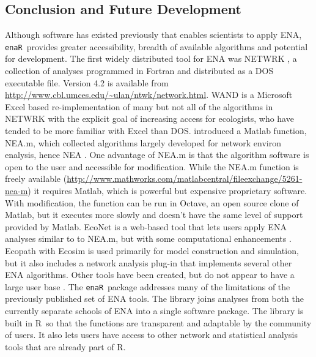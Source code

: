 \documentclass[11pt]{article}
\newcommand{\R}{R}
\newcommand{\enaR}{\texttt{enaR}}
\begin{document}
\begin{spacing}{2}
\section{Conclusion and Future Development}
Although software has existed previously that enables scientists to
apply ENA, \enaR\ provides greater accessibility, breadth of available
algorithms and potential for development. The first widely distributed
tool for ENA was NETWRK \citep{ulanowicz91}, a collection of analyses
programmed in Fortran and distributed as a DOS executable
file. Version 4.2 is available from
\url{http://www.cbl.umces.edu/~ulan/ntwk/network.html}. WAND is a
Microsoft Excel based re-implementation of many but not all of the
algorithms in NETWRK \citep{allesina04_wand} with the explicit goal of
increasing access for ecologists, who have tended to be more familiar
with Excel than DOS.  \citet{fath06} introduced a Matlab function,
NEA.m, which collected algorithms largely developed for network
environ enalysis, hence NEA \citep{patten91}.  One advantage of NEA.m
is that the algorithm software is open to the user and
accessible for modification.  While the NEA.m function is freely
available
(\url{http://www.mathworks.com/matlabcentral/fileexchange/5261-nea-m})
it requires Matlab, which is powerful but expensive proprietary
software.  With modification, the function can be run in Octave, an
open source clone of Matlab, but it executes more slowly and doesn't
have the same level of support provided by Matlab.  EcoNet is a
web-based tool that lets users apply ENA analyses similar to to NEA.m,
but with some computational enhancements \citep{kazanci07,
  schramski11}.  Ecopath with Ecosim \citep{christensen92,
  christensen04} is used primarily for model construction and
simulation, but it also includes a network analysis plug-in that
implements several other ENA algorithms.  Other tools have been
created, but do not appear to have a large user base
\citep{latham2006,kones09}. The \enaR\ package addresses many of the
limitations of the previously published set of ENA tools. The library
joins analyses from both the currently separate schools of ENA into a
single software package.  The library is built in \R\ so that the
functions are transparent and adaptable by the community of users.  It
also lets users have access to other network and statistical analysis
tools that are already part of \R.


\end{spacing}
\end{document}
